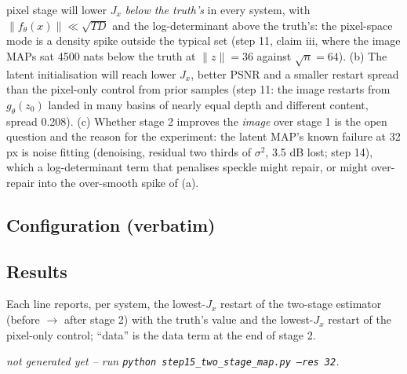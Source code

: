 \documentclass[11pt]{article}
\begin{document}
\begin{itemize}
        pixel stage will lower $J_x$ \emph{below the truth's} in every
        system, with $\|f_\theta(x)\| \ll \sqrt{TD}$ and the log-determinant
        above the truth's: the pixel-space mode is a density spike outside
        the typical set (step 11, claim iii, where the image MAPs sat 4500
        nats below the truth at $\|z\| = 36$ against $\sqrt n = 64$). (b)
        The latent initialisation will reach lower $J_x$, better PSNR and a
        smaller restart spread than the pixel-only control from prior
        samples (step 11: the image restarts from $g_\theta(z_0)$ landed in
        many basins of nearly equal depth and different content, spread
        0.208). (c) Whether stage 2 improves the \emph{image} over stage 1
        is the open question and the reason for the experiment: the
        latent MAP's known failure at 32 px is noise fitting (denoising,
        residual two thirds of $\sigma^2$, 3.5 dB lost; step 14), which a
        log-determinant term that penalises speckle might repair, or might
        over-repair into the over-smooth spike of (a).
\end{itemize}

\subsection{Configuration (verbatim)}
{\small}

\subsection{Results}
Each line reports, per system, the lowest-$J_x$ restart of the two-stage
estimator (before $\to$ after stage 2) with the truth's value and the
lowest-$J_x$ restart of the pixel-only control; ``data'' is the data term
at the end of stage 2.

  {\emph{not generated yet -- run \texttt{python step15\_two\_stage\_map.py --res 32}.}}
\end{document}
